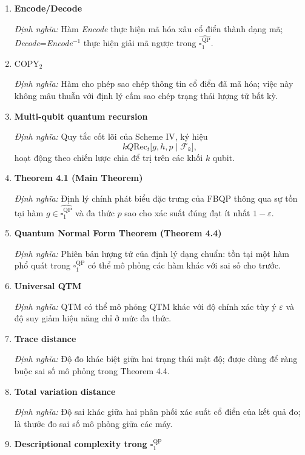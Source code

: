 \documentclass[12pt,a4paper]{article}
\begin{document}
\begin{enumerate}[leftmargin=*,itemsep=0.8em]
\item \textbf{Encode/Decode}

\textit{Định nghĩa:} Hàm \textit{Encode} thực hiện mã hóa xâu cổ điển thành dạng mã; \textit{Decode}=\textit{Encode}$^{-1}$ thực hiện giải mã ngược trong $\widehat{\square_{1}^{\mathrm{QP}}}$.

\item \textbf{$\mathrm{COPY}_2$}

\textit{Định nghĩa:} Hàm cho phép sao chép thông tin cổ điển đã mã hóa; việc này không mâu thuẫn với định lý cấm sao chép trạng thái lượng tử bất kỳ.

\item \textbf{Multi-qubit quantum recursion}

\textit{Định nghĩa:} Quy tắc cốt lõi của Scheme IV, ký hiệu
\[
kQ\mathrm{Rec}_t\bigl[g,h,p\mid\mathcal{F}_k\bigr],
\]
hoạt động theo chiến lược chia để trị trên các khối $k$ qubit.

\item \textbf{Theorem 4.1 (Main Theorem)}

\textit{Định nghĩa:} Định lý chính phát biểu đặc trưng của FBQP thông qua sự tồn tại hàm $g\in\widehat{\square_{1}^{\mathrm{QP}}}$ và đa thức $p$ sao cho xác suất đúng đạt ít nhất $1-\varepsilon$.

\item \textbf{Quantum Normal Form Theorem (Theorem 4.4)}

\textit{Định nghĩa:} Phiên bản lượng tử của định lý dạng chuẩn: tồn tại một hàm phổ quát trong $\square_{1}^{\mathrm{QP}}$ có thể mô phỏng các hàm khác với sai số cho trước.

\item \textbf{Universal QTM}

\textit{Định nghĩa:} QTM có thể mô phỏng QTM khác với độ chính xác tùy ý $\varepsilon$ và độ suy giảm hiệu năng chỉ ở mức đa thức.

\item \textbf{Trace distance}

\textit{Định nghĩa:} Độ đo khác biệt giữa hai trạng thái mật độ; được dùng để ràng buộc sai số mô phỏng trong Theorem 4.4.

\item \textbf{Total variation distance}

\textit{Định nghĩa:} Độ sai khác giữa hai phân phối xác suất cổ điển của kết quả đo; là thước đo sai số mô phỏng giữa các máy.

\item \textbf{Descriptional complexity trong $\square_{1}^{\mathrm{QP}}$}


\end{enumerate}
\end{document}
